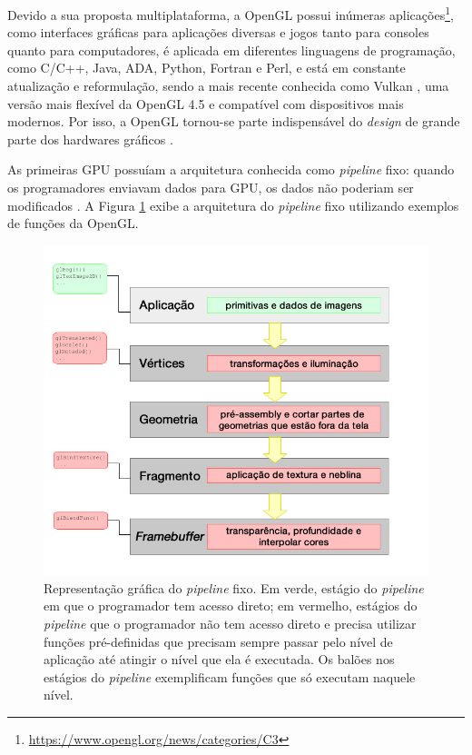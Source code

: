 Devido a sua proposta multiplataforma, a OpenGL possui inúmeras aplicações\footnote{\url{https://www.opengl.org/news/categories/C3}}, como interfaces gráficas para aplicações diversas e jogos tanto para consoles quanto para computadores, é aplicada em diferentes linguagens de programação, como C/C++, Java, ADA, Python, Fortran e Perl, e está em constante atualização e reformulação, sendo a mais recente conhecida como Vulkan \cite{vulkan}, uma versão mais flexível da OpenGL 4.5 e compatível com dispositivos mais modernos. Por isso, a OpenGL tornou-se parte indispensável do \emph{design} de grande parte dos hardwares gráficos \cite{nvidia}.

As primeiras \acrshort{GPU} possuíam a arquitetura conhecida como \emph{pipeline} fixo: quando os programadores enviavam dados para \acrshort{GPU}, os dados não poderiam ser modificados \cite{nvidia}. A Figura \ref{fig:arqopengl} exibe a arquitetura do \emph{pipeline} fixo utilizando exemplos de funções da OpenGL. 

 \begin{figure}[H]
    \centering
    \centerline{\includegraphics[width=1.3\textwidth]{img/opengl2}}
    \caption{Representação gráfica do \emph{pipeline} fixo\protect\footnotemark. Em verde, estágio do \emph{pipeline} em que o programador tem acesso direto; em vermelho, estágios do \emph{pipeline} que o programador não tem acesso direto e precisa utilizar funções pré-definidas que precisam sempre passar pelo nível de aplicação até atingir o nível que ela é executada. Os balões nos estágios do \emph{pipeline} exemplificam funções que só executam naquele nível.}
    \label{fig:arqopengl}
\end{figure}


